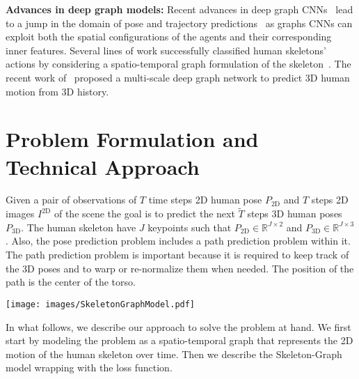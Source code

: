 \documentclass[10pt,twocolumn,letterpaper]{article}
\newcommand*{\ours}{Skeleton-Graph }
\begin{document}
\textbf{Advances in deep graph models: }Recent advances in deep graph CNNs~\cite{kipf2016semi} lead to a jump in the domain of pose and trajectory predictions~\cite{mohamed2020social,huang2019stgat,wang2021graphtcn,cai2019exploiting,wang2021graphtcn} as graphs CNNs can exploit both the spatial configurations of the agents and their corresponding inner features. Several lines of work successfully classified human skeletons' actions by considering a spatio-temporal graph formulation of the skeleton~\cite{yan2018spatial,huang2020spatio}. The recent work of~\cite{li2020dynamic} proposed a multi-scale deep graph network to predict 3D human motion from 3D history.

\section{Problem Formulation and Technical Approach}
Given a pair of observations of $T$ time steps 2D human pose $P_\text{2D}$ and $T$ steps 2D images $I^\text{2D}$ of the scene the goal is to predict the next $\tilde{T}$ steps 3D human poses $P_\text{3D}$. The human skeleton have $J$ keypoints such that $P_\text{2D} \in \mathbb{R}^{J\times2}$ and $P_\text{3D} \in \mathbb{R}^{J\times3}$. Also, the pose prediction problem includes a path prediction problem within it. The path prediction problem is important because it is required to keep track of the 3D poses and to warp or re-normalize them when needed. The position of the path is the center of the torso.

\begin{figure*}[t]
\begin{center}
\texttt{[image: images/SkeletonGraphModel.pdf]}
\end{center}
   \caption{\ours model components. The model receives as an input a 2D skeleton temporal $T$ graph poses $\mathcal{V,A}$ and predicts the the next 3D skeleton temporal poses. The model can learn a suitable adjacency $\mathcal{\tilde{A}}$ matrix through the adjacency CNN. Also, it can use the observed visual signal in the form of a still image or a video. The time-extrapolator CNN is responsible for predicting the next $\tilde{T}$ temporal 3D poses, while the spatio-temporal graph CNN processes the 2D temporal graphs. $J, F, C, [x,y,z]$ are the number of the skeleton joints, the learned features dimensions, the vision features channels and the joint coordinates, respectively. }
\label{gr:model}
\end{figure*}
In what follows, we describe our approach to solve the problem at hand. We first start by modeling the problem as a spatio-temporal graph that represents the 2D motion of the human skeleton over time. Then we describe the \ours model wrapping with the loss function. 
\end{document}
